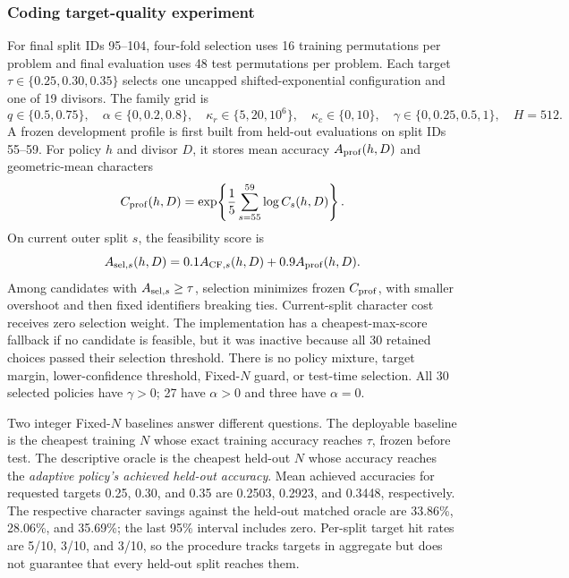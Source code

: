 \subsubsection{Coding target-quality experiment}

For final split IDs 95--104, four-fold selection uses 16 training
permutations per problem and final evaluation uses 48 test permutations per
problem.  Each target
$\tau\in\{0.25,0.30,0.35\}$ selects one uncapped shifted-exponential
configuration and one of 19 divisors.  The family grid is
\begin{equation}
 q\in\{0.5,0.75\},\quad
 \alpha\in\{0,0.2,0.8\},\quad
 \kappa_r\in\{5,20,10^6\},\quad
 \kappa_c\in\{0,10\},\quad
 \gamma\in\{0,0.25,0.5,1\},\quad H=512.
 \label{eq:coding-target-grid}
\end{equation}
A frozen development profile is first built from held-out evaluations on
split IDs 55--59.  For policy $h$ and divisor $D$, it stores mean accuracy
$A_{\rm prof}(h,D)$ and geometric-mean characters
\begin{equation}
 C_{\rm prof}(h,D)=
 \exp\!\left\{\frac15\sum_{s=55}^{59}\log C_s(h,D)\right\}.
\end{equation}
On current outer split $s$, the feasibility score is
\begin{equation}
 A_{{\rm sel},s}(h,D)=0.1A_{{\rm CF},s}(h,D)+0.9A_{\rm prof}(h,D).
 \label{eq:coding-target-selection}
\end{equation}
Among candidates with $A_{{\rm sel},s}\ge\tau$, selection minimizes frozen
$C_{\rm prof}$, with smaller overshoot and then fixed identifiers breaking
ties.  Current-split character cost receives zero selection weight.  The
implementation has a cheapest-max-score fallback if no candidate is feasible,
but it was inactive because all 30 retained choices passed their selection
threshold.  There is no policy mixture, target margin, lower-confidence
threshold, Fixed-$N$ guard, or test-time selection.  All 30 selected policies
have $\gamma>0$; 27 have $\alpha>0$ and three have $\alpha=0$.

Two integer Fixed-$N$ baselines answer different questions.  The deployable
baseline is the cheapest training $N$ whose exact training accuracy reaches
$\tau$, frozen before test.  The descriptive oracle is the cheapest held-out
$N$ whose accuracy reaches the \emph{adaptive policy's achieved held-out
accuracy}.  Mean achieved accuracies for requested targets 0.25, 0.30, and
0.35 are 0.2503, 0.2923, and 0.3448, respectively.  The respective character
savings against the held-out matched oracle are 33.86\%, 28.06\%, and 35.69\%;
the last 95\% interval includes zero.  Per-split target hit rates are 5/10,
3/10, and 3/10, so the procedure tracks targets in aggregate but does not
guarantee that every held-out split reaches them.

